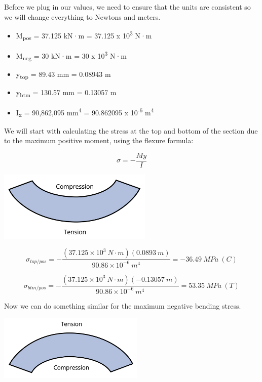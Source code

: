 \documentclass[
  letterpaper,
  DIV=11,
  numbers=noendperiod]{scrreprt}
\begin{document}
\begin{tcolorbox}
\begin{tcolorbox}
Before we plug in our values, we need to ensure that the units are
consistent so we will change everything to Newtons and meters.

\begin{itemize}
\item
  M\textsubscript{pos} = 37.125 kN·m = 37.125 x 10\textsuperscript{3}
  N·m
\item
  M\textsubscript{neg} = 30 kN·m = 30 x 10\textsuperscript{3} N·m
\item
  y\textsubscript{top} = 89.43 mm = 0.08943 m
\item
  y\textsubscript{btm} = 130.57 mm = 0.13057 m
\item
  I\textsubscript{x} = 90,862,095 mm\textsuperscript{4} = 90.862095 x
  10\textsuperscript{-6} m\textsuperscript{4}
\end{itemize}

We will start with calculating the stress at the top and bottom of the
section due to the maximum positive moment, using the flexure formula:

\[ \sigma=-\frac{M y}{I} \]

\begin{center}
\includegraphics[width=2.89583in,height=\textheight]{images/CH9 PNGs/Example 9.2 part 6.png}
\end{center}

\[ \sigma_{top/pos}=-\frac{\left(37.125 \times 10^3{~N}\cdot{m}\right)(0.0893 {~m})}{90.86 \times 10^{-6}{~m}^4}=-36.49{~MPa~(C)} \]

\[ \sigma_{btm/pos}=-\frac{\left(37.125\times10^3{~N}\cdot{m}\right)(-0.13057{~m})}{90.86 \times 10^{-6}{~m}^4}=53.35{~MPa}{~(T)} \]

Now we can do something similar for the maximum negative bending stress.

\begin{center}
\includegraphics[width=2.72917in,height=\textheight]{images/CH9 PNGs/Example 9.2 part 7.png}
\end{center}


\end{tcolorbox}
\end{tcolorbox}
\end{document}

